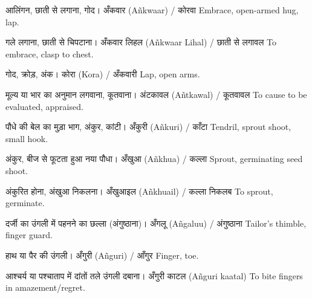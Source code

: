 
%
{आलिंगन, छाती से लगाना, गोद।}%
{अँकवार (Añkwaar) / कोरवा}%
{Embrace, open-armed hug, lap.}

%
{गले लगाना, छाती से चिपटाना।}%
{अँकवार लिहल (Añkwaar Lihal) / छाती से लगावल}%
{To embrace, clasp to chest.}

%
{गोद, क्रोड़, अंक।}%
{कोरा (Kora) / अँकवारी}%
{Lap, open arms.}

%
{मूल्य या भार का अनुमान लगवाना, कूतवाना।}%
{अंटकावल (Añtkawal) / कूतवावल}%
{To cause to be evaluated, appraised.}

%
{पौधे की बेल का मुड़ा भाग, अंकुर, कांटी।}%
{अँकुरी (Añkuri) / काँटा}%
{Tendril, sprout shoot, small hook.}

%
{अंकुर, बीज से फूटता हुआ नया पौधा।}%
{अँखुआ (Añkhua) / कल्ला}%
{Sprout, germinating seed shoot.}

%
{अंकुरित होना, अंखुआ निकलना।}%
{अँखुआइल (Añkhuail) / कल्ला निकलब}%
{To sprout, germinate.}

%
{दर्जी का उंगली में पहनने का छल्ला (अंगुष्ठाना)।}%
{अँगलू (Añgaluu) / अंगुष्ठाना}%
{Tailor's thimble, finger guard.}

%
{हाथ या पैर की उंगली।}%
{अँगुरी (Añguri) / आँगुर}%
{Finger, toe.}

%
{आश्चर्य या पश्चाताप में दांतों तले उंगली दबाना।}%
{अँगुरी काटल (Añguri kaatal)}%
{To bite fingers in amazement/regret.}

